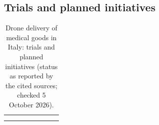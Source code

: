 
\begin{landscape}
\section{Trials and planned initiatives}\label{appendix:medical-drone-trials}
\longtablesetup
\begin{longtable}{G{0.078} L{0.119} L{0.064} L{0.200} L{0.132} L{0.183} L{0.151} L{0.073}}
\caption[Drone delivery of medical goods in Italy: trials and planned initiatives]{Drone delivery of medical goods in Italy: trials and planned initiatives (status as reported by the cited sources; checked 5 October 2026).}
\label{tab:medical-drone-trials}\\
\headrow{} &  &  &  &  &  &  &  \\
\endfirsthead
\headrow{} &  &  &  &  &  &  &  \\
\endhead
{}
\endfoot
\lastrule
\endlastfoot


\end{longtable}
\end{landscape}
